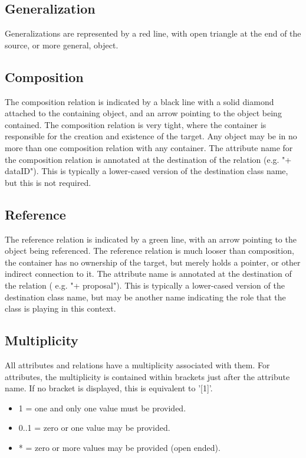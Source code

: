   \subsection{Generalization}
  \label{sect:Generalization}
  Generalizations are represented by a red line, with open triangle at the end of the source, or more general, object.

  \subsection{Composition}
  \label{sect:Composition}
  The composition relation is indicated by a black line with a solid diamond attached to the
containing object, and an arrow pointing to the object being contained. The composition relation is
very tight, where the container is responsible for the creation and existence of the target. Any
object may be in no more than one composition relation with any container. The attribute name
for the composition relation is annotated at the destination of the relation (e.g. "+ dataID"). This is
typically a lower-cased version of the destination class name, but this is not required.

  \subsection{Reference}
  \label{sect:Reference}
  The reference relation is indicated by a green line, with an arrow pointing to the object being
referenced. The reference relation is much looser than composition, the container has no
ownership of the target, but merely holds a pointer, or other indirect connection to it. The
attribute name is annotated at the destination of the relation ( e.g. "+ proposal"). This is typically
a lower-cased version of the destination class name, but may be another name indicating the role
that the class is playing in this context.

  \subsection{Multiplicity}
  \label{sect:Multiplicity}
  All attributes and relations have a multiplicity associated with them. For attributes, the multiplicity
is contained within brackets just after the attribute name. If no bracket is displayed, this is
equivalent to '[1]'.
\begin{itemize}
\item 1 = one and only one value must be provided.
\item 0..1 = zero or one value may be provided.
\item * = zero or more values may be provided (open ended).
\end{itemize}

